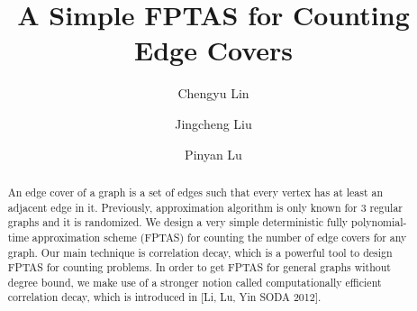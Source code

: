 \documentclass[a4paper]{article}
\title{A Simple FPTAS for Counting Edge Covers}
\begin{document}
\author{Chengyu Lin
	\and
	Jingcheng Liu
	\and
	Pinyan Lu
}
\maketitle
\begin{abstract}
An edge cover of a graph is a set of edges such that every vertex has at least an adjacent edge in it. Previously, approximation algorithm is only known for 3 regular graphs and it is randomized. We design a very simple deterministic fully polynomial-time approximation scheme  (FPTAS) for counting the number of edge covers for any graph. Our main technique is correlation decay, which is a powerful tool to design FPTAS for counting problems. In order to get FPTAS for general graphs without degree bound, we make use of a stronger notion called computationally efficient correlation decay, which is introduced in [Li, Lu, Yin SODA 2012].  
\end{abstract}












\end{document}
